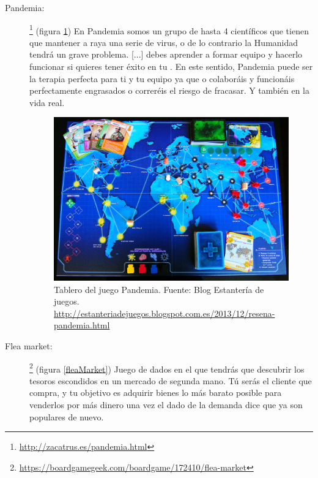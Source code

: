 \begin{description}
\item[Pandemia: ] \footnote{\url{http://zacatrus.es/pandemia.html}} (figura \ref{pandemia}) En Pandemia somos un grupo de hasta 4 científicos que tienen que mantener a raya una serie de virus, o de lo contrario la Humanidad tendrá un grave problema. [...] debes aprender a formar equipo y hacerlo funcionar si quieres tener éxito en tu . En este sentido, Pandemia puede ser la terapia perfecta para ti y tu equipo ya que o colaboráis y funcionáis perfectamente engrasados o correréis el riesgo de fracasar. Y también en la vida real. \cite{faceentrepreneurship2016}

\begin{figure}
\begin{center}
\includegraphics[scale=0.25]{imagenes/pandemia.jpg}
\caption{Tablero del juego Pandemia.  Fuente: Blog Estantería de juegos. \url{http://estanteriadejuegos.blogspot.com.es/2013/12/resena-pandemia.html}}
\label{pandemia}
\end{center}
\end{figure}

\item[Flea market:] \footnote{\url{https://boardgamegeek.com/boardgame/172410/flea-market}} (figura \ref{fleaMarket}) Juego de dados en el que tendrás que descubrir los tesoros escondidos en un mercado de segunda mano. Tú serás el cliente que compra, y tu objetivo es adquirir bienes lo más barato posible para venderlos por más dinero una vez el dado de la demanda dice que ya son populares de nuevo. \cite{mariagonzalez2015}


\end{description}

